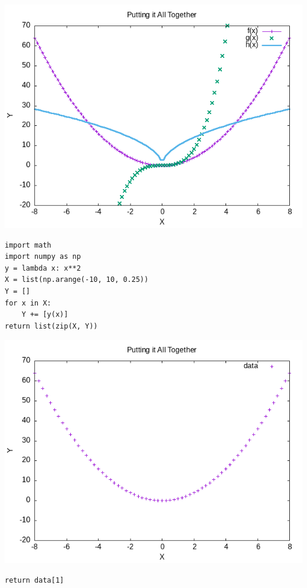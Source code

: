 \documentclass{article}
\begin{document}
\begin{center}
\includegraphics[width=.9\linewidth]{plot1.png}
\end{center}


\begin{verbatim}
import math
import numpy as np
y = lambda x: x**2
X = list(np.arange(-10, 10, 0.25))
Y = []
for x in X:
    Y += [y(x)]
return list(zip(X, Y))
\end{verbatim}

\begin{center}
\includegraphics[width=.9\linewidth]{plot2.png}
\end{center}

\begin{verbatim}
return data[1]
\end{verbatim}
\end{document}
